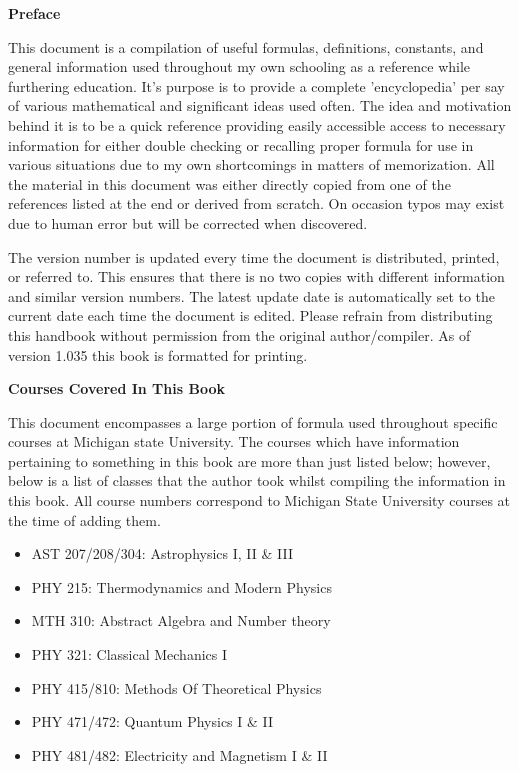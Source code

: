 \begin{center}
	\textbf{Preface}
\end{center}

This document is a compilation of useful formulas, definitions, constants, and general information used throughout my own schooling as a reference while furthering education. It's purpose is to provide a complete 'encyclopedia' per say of various mathematical and significant ideas used often. The idea and motivation behind it is to be a quick reference providing easily accessible access to necessary information for either double checking or recalling proper formula for use in various situations due to my own shortcomings in matters of memorization. All the material in this document was either directly copied from one of the references listed at the end or derived from scratch. On occasion typos may exist due to human error but will be corrected when discovered.
	
The version number is updated every time the document is distributed, printed, or referred to. This ensures that there is no two copies with different information and similar version numbers. The latest update date is automatically set to the current date each time the document is edited. Please refrain from distributing this handbook without permission from the original author/compiler. As of version 1.035 this book is formatted for printing.

\begin{center}
	\textbf{Courses Covered In This Book}
\end{center}

This document encompasses a large portion of formula used throughout specific courses at Michigan state University. The courses which have information pertaining to something in this book are more than just listed below; however, below is a list of classes that the author took whilst compiling the information in this book. All course numbers correspond to Michigan State University courses at the time of adding them. 

\begin{itemize}
	\item AST 207/208/304: Astrophysics I, II \& III
	\item PHY 215: Thermodynamics and Modern Physics
	\item MTH 310: Abstract Algebra and Number theory
	\item PHY 321: Classical Mechanics I
	\item PHY 415/810: Methods Of Theoretical Physics
	\item PHY 471/472: Quantum Physics I \& II
	\item PHY 481/482: Electricity and Magnetism I \& II
\end{itemize} 

